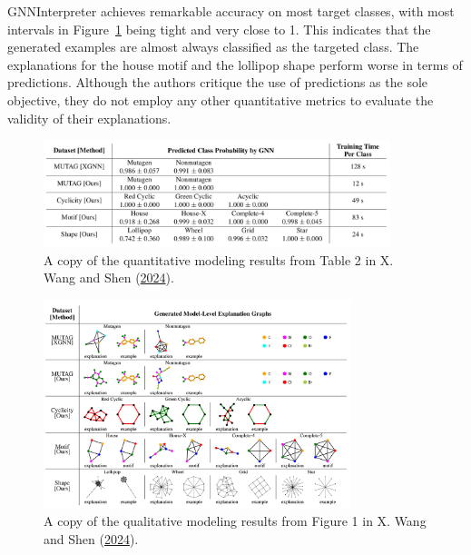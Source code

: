 \documentclass[
  11pt,
  letterpaper,
]{article}
\begin{document}
GNNInterpreter achieves remarkable accuracy on most target classes, with
most intervals in Figure~\ref{fig-GNNInt-pred-results} being tight and
very close to 1. This indicates that the generated examples are almost
always classified as the targeted class. The explanations for the house
motif and the lollipop shape perform worse in terms of predictions.
Although the authors critique the use of predictions as the sole
objective, they do not employ any other quantitative metrics to evaluate
the validity of their explanations.

\begin{figure}

{\centering \includegraphics[width=0.9\textwidth,height=\textheight]{figures/GNNInt_prediction_results.png}

}

\caption{\label{fig-GNNInt-pred-results}A copy of the quantitative
modeling results from Table 2 in X. Wang and Shen
(\protect\hyperlink{ref-Wang_Shen_2024}{2024}).}

\end{figure}

\begin{figure}

{\centering \includegraphics[width=0.8\textwidth,height=\textheight]{figures/GNNInt_drawn_results.png}

}

\caption{\label{fig-GNNInt-Drawn}A copy of the qualitative modeling
results from Figure 1 in X. Wang and Shen
(\protect\hyperlink{ref-Wang_Shen_2024}{2024}).}

\end{figure}
\end{document}
